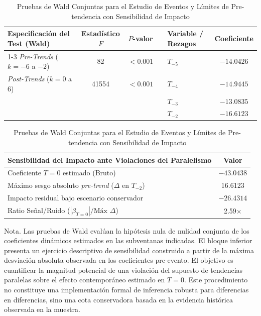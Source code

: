 \begin{table}[H]
    \centering
    \caption{Pruebas de Wald Conjuntas para el Estudio de Eventos y L\'imites de Pre-tendencia con Sensibilidad de Impacto}
    \label{tab:wald_pretrends}
    \small
    
    \begin{tabular}{p{5.5cm}cc p{0.6cm} p{3.8cm}c}
        \toprule
        Especificaci\'on del Test (Wald) & Estad\'istico $F$ & $P$-valor && Variable / Rezagos & Coeficiente \\
        \cline{1-3} \cline{5-6}
        \addlinespace
        \textit{Pre-Trends} ($k = -6$ a $-2$)  & 82     & $<0.001$ && $T_{-5}$ & $-14.0426$ \\
        \textit{Post-Trends} ($k = 0$ a $6$)   & 41554  & $<0.001$ && $T_{-4}$ & $-14.9445$ \\
                                               &             &        && $T_{-3}$ & $-13.0835$ \\
                                               &             &        && $T_{-2}$ & $-16.6123$ \\
        \bottomrule
    \end{tabular}
    
    \vspace{0.3cm}
    
    \begin{tabular}{p{9.0cm}c}
        \toprule
        Sensibilidad del Impacto ante Violaciones del Paralelismo & Valor \\
        \midrule
        Coeficiente $T = 0$ estimado (Bruto) & $-43.0438$ \\
        M\'aximo sesgo absoluto \textit{pre-trend} ($\Delta$ en $T_{-2}$) & 16.6123 \\
        Impacto residual bajo escenario conservador & $-26.4314$ \\
        Ratio Se\~nal/Ruido ($|\beta_{T=0}| / \text{M\'ax } \Delta$) & 2.59$\times$ \\
        \bottomrule
    \end{tabular}
    
    \vspace{0.15cm}
    \begin{flushleft}
    \small{Nota. Las pruebas de Wald eval\'uan la hip\'otesis nula de nulidad conjunta de los coeficientes din\'amicos estimados en las subventanas indicadas. El bloque inferior presenta un ejercicio descriptivo de sensibilidad construido a partir de la m\'axima desviaci\'on absoluta observada en los coeficientes pre-evento. El objetivo es cuantificar la magnitud potencial de una violaci\'on del supuesto de tendencias paralelas sobre el efecto contempor\'aneo estimado en $T = 0$. Este procedimiento no constituye una implementaci\'on formal de inferencia robusta para diferencias en diferencias, sino una cota conservadora basada en la evidencia hist\'orica observada en la muestra.}
    \end{flushleft}
\end{table}

